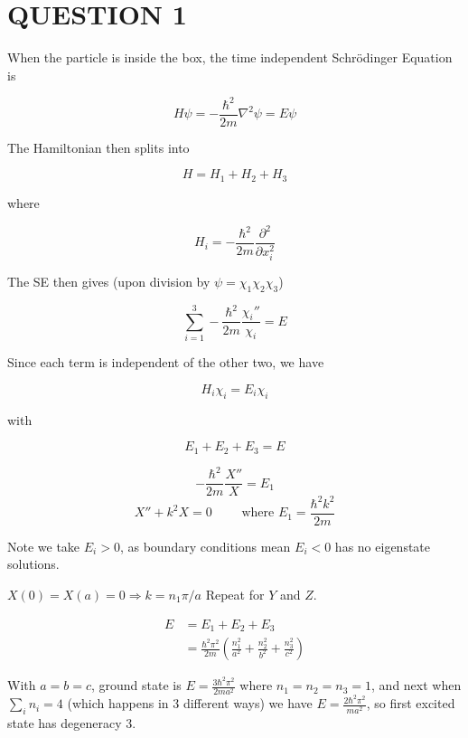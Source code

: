 \documentclass[a4paper]{article}
\begin{document}
	
\maketitle

\section{QUESTION 1}

When the particle is inside the box, the time independent Schr\"odinger Equation is 

\[ H \psi = - \frac{\hbar^{2}}{2m} \nabla^{2} \psi = E \psi \]

The Hamiltonian then splits into

\[ H = H_{1} + H_{2} + H_{3} \]

where

\[ H_{i} = - \frac{\hbar^{2}}{2m} \frac{\partial^{2} }{\partial x_{i}^{2}} \]

The SE then gives (upon division by $ \psi = \chi_{1}\chi_{2}\chi_{3} $)

\[  \sum_{i=1}^{3} - \frac{\hbar^{2}}{2m}  \frac{\chi_{i}''}{\chi_{i}} = E  \]

Since each term is independent of the other two, we have

\[ H_{i}\chi_{i} = E_{i}\chi_{i} \]

with 

\[ E_{1} + E_{2} + E_{3} = E \]

\[ - \frac{\hbar^{2}}{2m}\frac{X''}{X} = E_{1} \]
\[ X'' + k^{2}X = 0  \qquad \text{ where } E_{1} = \frac{\hbar^{2}k^{2}}{2m}  \]

Note we take $ E_{i} > 0 $, as boundary conditions mean $ E_{i} < 0 $ has no eigenstate solutions.

$ X(0) = X(a) = 0 \Rightarrow k = n_{1} \pi / a  $
Repeat for $ Y $ and $ Z $. 

\begin{align*}
 E & = E_{1} + E_{2} + E_{3} \\
  & = \frac{\hbar^{2} \pi^{2}}{2m} \left(  \frac{n_{1}^{2}}{a^{2}} + \frac{n_{2}^{2}}{b^{2}} + \frac{n_{3}^{2}}{c^{2}}  \right)
\end{align*}
 
 With $ a = b = c $, ground state is $  E = \frac{3 \hbar^{2} \pi^{2}}{2ma^{2}} $ where $ n_{1} = n_{2} = n_{3} = 1 $, and next when $ \sum_{i} n_{i} = 4 $ (which happens in 3 different ways) we have $  E = \frac{2\hbar^{2} \pi^{2}}{ma^{2}} $, so first excited state has degeneracy 3. 
\end{document}
